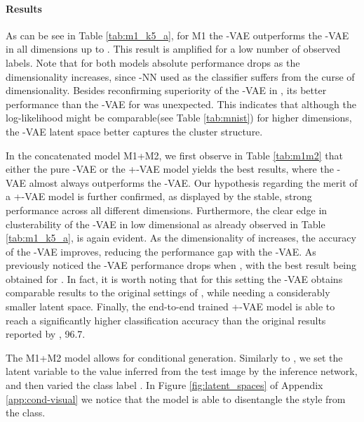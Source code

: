 \documentclass[letterpaper]{article}
\begin{document}
\paragraph{Results}

As can be see in Table \ref{tab:m1_k5_a}, for M1 the \Sv-VAE outperforms the \Nv-VAE in all dimensions up to . This result is amplified for a low number of observed labels. Note that for both models absolute performance drops as the dimensionality increases, since -NN used as the classifier suffers from the curse of dimensionality. Besides reconfirming superiority of the \Sv-VAE in , its better performance than the \Nv-VAE for  was unexpected. This indicates that although the log-likelihood might be comparable(see Table \ref{tab:mnist}) for higher dimensions, the \Sv-VAE latent space better captures the cluster structure.

In the concatenated model M1+M2, we first observe in Table \ref{tab:m1m2} that either the pure \Sv-VAE or the \Sv+\Nv-VAE model yields the best results, where the \Sv-VAE almost always outperforms the \Nv-VAE. Our hypothesis regarding the merit of a \Sv+\Nv-VAE model is further confirmed, as displayed by the stable, strong performance across all different dimensions. Furthermore, the clear edge in clusterability of the \Sv-VAE in low dimensional  as already observed in Table \ref{tab:m1_k5_a}, is again evident. As the dimensionality of  increases, the accuracy of the \Nv-VAE improves, reducing the performance gap with the \Sv-VAE. As previously noticed the \Sv-VAE performance drops when , with the best result being obtained for . In fact, it is worth noting that for this setting the \Sv-VAE obtains comparable results to the original settings of \citep{kingma-semi-super}, while needing a considerably smaller latent space. Finally, the end-to-end trained \Sv+\Nv-VAE model is able to reach a significantly higher classification accuracy than the original results reported by \citet{kingma-semi-super}, 96.7{\tiny}.

The M1+M2 model allows for conditional generation. Similarly to \citep{kingma-semi-super}, we set the latent variable  to the value inferred from the test image by the inference network, and then varied the class label . In Figure \ref{fig:latent_spaces} of Appendix \ref{app:cond-visual} we notice that the model is able to disentangle the style from the class.
\end{document}
